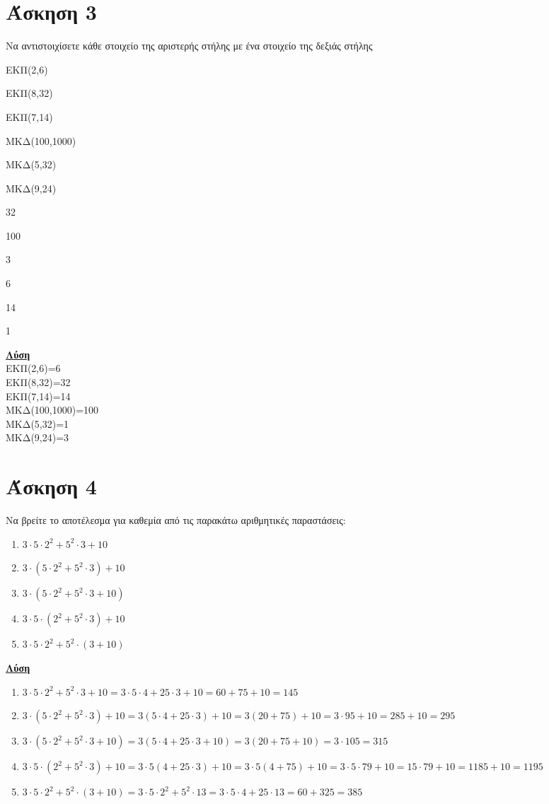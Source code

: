 \documentclass[a4paper,10pt]{report}
\begin{document}
\section*{Άσκηση 3  \hfill \small{}}
Να αντιστοιχίσετε κάθε στοιχείο της αριστερής στήλης με ένα στοιχείο της δεξιάς στήλης
\begin{itemize}
\begin{multicols}{2}
 \item ΕΚΠ(2,6)
 \item ΕΚΠ(8,32)
 \item ΕΚΠ(7,14)
 \item ΜΚΔ(100,1000)
 \item ΜΚΔ(5,32)
 \item ΜΚΔ(9,24)
 \item 32
 \item 100
 \item 3
 \item 6
 \item 14
 \item 1
\end{multicols}
\end{itemize}
\underline{\textbf{Λύση}}\\
 ΕΚΠ(2,6)=6 \\
 ΕΚΠ(8,32)=32 \\
 ΕΚΠ(7,14)=14 \\
 ΜΚΔ(100,1000)=100 \\
 ΜΚΔ(5,32)=1\\
 ΜΚΔ(9,24)=3

\section*{Άσκηση 4  \hfill \small{}}
Να βρείτε το αποτέλεσμα για καθεμία από τις παρακάτω αριθμητικές παραστάσεις:
\begin{enumerate}[1)]
 \item $3\cdot5\cdot2^{2}+5^{2}\cdot3+10$
 \item $3\cdot(5\cdot2^{2}+5^{2}\cdot3)+10$
 \item $3\cdot(5\cdot2^{2}+5^{2}\cdot3+10)$
 \item $3\cdot5\cdot(2^{2}+5^{2}\cdot3)+10$
 \item $3\cdot5\cdot2^{2}+5^{2}\cdot(3+10)$
\end{enumerate}
\underline{\textbf{Λύση}}\\ 
\begin{enumerate}[1)]
 \item $3\cdot5\cdot2^{2}+5^{2}\cdot3+10 = 3\cdot 5 \cdot4 +25\cdot 3+10 = 60+75+10 =145$
 \item $3\cdot(5\cdot2^{2}+5^{2}\cdot3)+10 = 3(5\cdot 4 +25\cdot 3)+10 = 3(20+75)+10 =3\cdot 95 +10 =285+10=295$
 \item $3\cdot(5\cdot2^{2}+5^{2}\cdot3+10)=3(5\cdot 4+25\cdot3 +10)=3(20+75+10)=3\cdot 105=315$
 \item $3\cdot5\cdot(2^{2}+5^{2}\cdot3)+10 = 3\cdot 5(4+25\cdot3)+10=3\cdot5(4+75)+10=3\cdot5\cdot79+10=15\cdot79+10=1185+10=1195$
 \item $3\cdot5\cdot2^{2}+5^{2}\cdot(3+10)=3\cdot 5\cdot2^{2}+5^{2}\cdot13=3\cdot5\cdot4+25\cdot13=60+325=385$
\end{enumerate}
\end{document}
